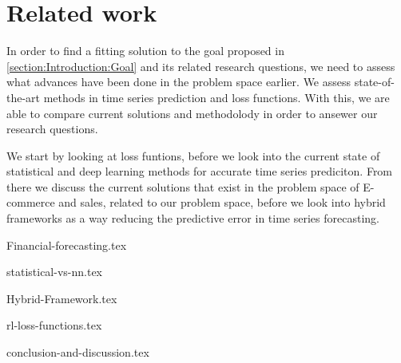 \chapter{Related work}
\label{section:RelatedWork}

\iffalse
Our problem can be composed into two main categories.
time series forecasting, and e-commerce trend forecasting.
What is the characteristics of e-commerce trend forecasting?
The domain consists of multiple time series, some which correlate.
The time series contains multiple periods, for example users shop
online ofter on sundays than on mondays. 
Some categories are popular in the spring, others in the fall.
Mabye online shopping spikes around common paydays?
\fi


In order to find a fitting solution to the goal proposed in \ref{section:Introduction:Goal} and its related research questions,
we need to assess what advances have been done in the problem space earlier.
We assess state-of-the-art methods in time series prediction and loss functions.
With this, we are able to compare current solutions and methodolody in order to ansewer our research questions.

We start by looking at loss funtions, before we look into the current state of statistical and deep learning methods for accurate time series prediciton.
From there we discuss the current solutions that exist in the problem space of E-commerce and sales, related to our problem space,
before we look into hybrid frameworks as a way reducing the predictive error in time series forecasting.



{Financial-forecasting.tex}

{statistical-vs-nn.tex}

{Hybrid-Framework.tex}

{rl-loss-functions.tex}

{conclusion-and-discussion.tex}